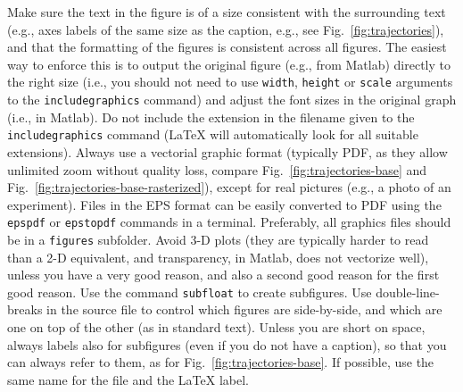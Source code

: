 \documentclass[letterpaper, 10 pt, conference]{ieeeconf}
\begin{document}
Make sure the text in the figure is of a size consistent with the surrounding text (e.g., axes labels of the same size as the caption, e.g., see Fig.~\ref{fig:trajectories}), and that the formatting of the figures is consistent across all figures. The easiest way to enforce this is to output the original figure (e.g., from Matlab) directly to the right size (i.e., you should not need to use \verb|width|,  \verb|height| or \verb|scale| arguments to the \verb|includegraphics| command) and adjust the font sizes in the original graph (i.e., in Matlab). Do not include the extension in the filename given to the \verb|includegraphics| command  ({\LaTeX} will automatically look for all suitable extensions). Always use a vectorial graphic format (typically PDF, as they allow unlimited zoom without quality loss, compare Fig.~\ref{fig:trajectories-base} and Fig.~\ref{fig:trajectories-base-rasterized}), except for real pictures (e.g., a photo of an experiment). Files in the EPS format can be easily converted to PDF using the \verb|epspdf| or \verb|epstopdf| commands in a terminal. Preferably, all graphics files should be in a \verb|figures| subfolder. Avoid 3-D plots (they are typically harder to read than a 2-D equivalent, and transparency, in Matlab, does not vectorize well), unless you have a very good reason, and also a second good reason for the first good reason.
Use the command \verb|subfloat| to create subfigures. Use double-line-breaks in the source file to control which figures are side-by-side, and which are one on top of the other (as in standard text). Unless you are short on space, always labels also for subfigures (even if you do not have a caption), so that you can always refer to them, as for Fig.~\ref{fig:trajectories-base}. If possible, use the same name for the file and the \LaTeX{} label.
\end{document}

